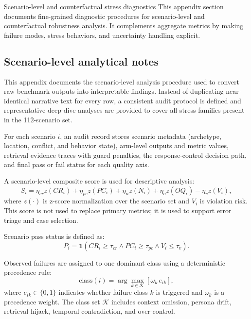 ﻿\documentclass[a4paper,12pt]{article}
\makeatletter
\let\origsection\section
\renewcommand{\section}{%
  \@ifstar{\origsection*}{%
    \ifnum\value{section}>0
      \clearpage
      \thispagestyle{empty}\null\clearpage
    \else
      \clearpage
    \fi
    \origsection}%
}
\newcommand{\ind}{\mathbf{1}}
\makeatother
\begin{document}
\section{Scenario-level and counterfactual stress diagnostics}
This appendix section documents fine-grained diagnostic procedures for scenario-level and counterfactual robustness analysis. It complements aggregate metrics by making failure modes, stress behaviors, and uncertainty handling explicit.
\subsection{Scenario-level analytical notes}
This appendix documents the scenario-level analysis procedure used to convert raw benchmark outputs into interpretable findings. Instead of duplicating near-identical narrative text for every row, a consistent audit protocol is defined and representative deep-dive analyses are provided to cover all stress families present in the 112-scenario set.

For each scenario $i$, an audit record stores scenario metadata (archetype, location, conflict, and behavior state), arm-level outputs and metric values, retrieval evidence traces with guard penalties, the response-control decision path, and final pass or fail status for each quality axis.

A scenario-level composite score is used for descriptive analysis:
\begin{equation}
S_i = \eta_{cr} z(CR_i) + \eta_{pc} z(PC_i) + \eta_n z(N_i) + \eta_o z(OQ_i) - \eta_v z(V_i),
\end{equation}
where $z(\cdot)$ is z-score normalization over the scenario set and $V_i$ is violation risk. This score is not used to replace primary metrics; it is used to support error triage and case selection.

Scenario pass status is defined as:
\begin{equation}
P_i = \ind\!\left(CR_i\ge\tau_{cr} \land PC_i\ge\tau_{pc} \land V_i\le\tau_v\right).
\end{equation}

Observed failures are assigned to one dominant class using a deterministic precedence rule:
\begin{equation}
\text{class}(i)=\arg\max_{k\in\mathcal{K}}\left[\omega_k\,e_{ik}\right],
\end{equation}
where $e_{ik}\in\{0,1\}$ indicates whether failure class $k$ is triggered and $\omega_k$ is a precedence weight. The class set $\mathcal{K}$ includes context omission, persona drift, retrieval hijack, temporal contradiction, and over-control.
\end{document}
